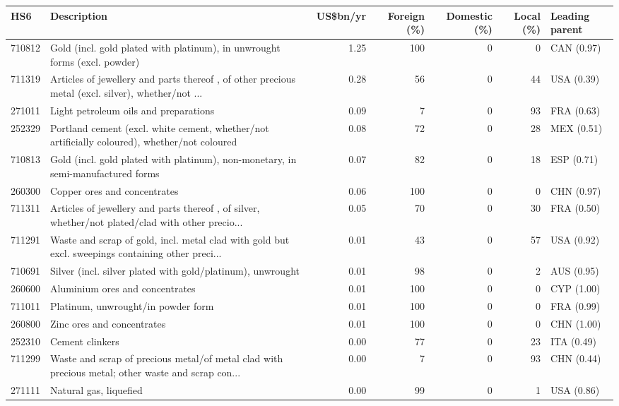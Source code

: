 \begin{tabular}{@{}l p{6.4cm} r r r r l@{}}
\toprule
HS6 & Description & US\$bn/yr & Foreign (\%) & Domestic (\%) & Local (\%) & Leading parent \\
\midrule
710812 & Gold (incl. gold plated with platinum), in unwrought forms (excl. powder) & 1.25 & 100 & 0 & 0 & CAN (0.97) \\
711319 & Articles of jewellery and parts thereof , of other precious metal (excl. silver), whether/\allowbreak{}not ... & 0.28 & 56 & 0 & 44 & USA (0.39) \\
271011 & Light petroleum oils and preparations & 0.09 & 7 & 0 & 93 & FRA (0.63) \\
252329 & Portland cement (excl. white cement, whether/\allowbreak{}not artificially coloured), whether/\allowbreak{}not coloured & 0.08 & 72 & 0 & 28 & MEX (0.51) \\
710813 & Gold (incl. gold plated with platinum), non-monetary, in semi-manufactured forms & 0.07 & 82 & 0 & 18 & ESP (0.71) \\
260300 & Copper ores and concentrates & 0.06 & 100 & 0 & 0 & CHN (0.97) \\
711311 & Articles of jewellery and parts thereof , of silver, whether/\allowbreak{}not plated/\allowbreak{}clad with other precio... & 0.05 & 70 & 0 & 30 & FRA (0.50) \\
711291 & Waste and scrap of gold, incl. metal clad with gold but excl. sweepings containing other preci... & 0.01 & 43 & 0 & 57 & USA (0.92) \\
710691 & Silver (incl. silver plated with gold/\allowbreak{}platinum), unwrought & 0.01 & 98 & 0 & 2 & AUS (0.95) \\
260600 & Aluminium ores and concentrates & 0.01 & 100 & 0 & 0 & CYP (1.00) \\
711011 & Platinum, unwrought/\allowbreak{}in powder form & 0.01 & 100 & 0 & 0 & FRA (0.99) \\
260800 & Zinc ores and concentrates & 0.01 & 100 & 0 & 0 & CHN (1.00) \\
252310 & Cement clinkers & 0.00 & 77 & 0 & 23 & ITA (0.49) \\
711299 & Waste and scrap of precious metal/\allowbreak{}of metal clad with precious metal; other waste and scrap con... & 0.00 & 7 & 0 & 93 & CHN (0.44) \\
271111 & Natural gas, liquefied & 0.00 & 99 & 0 & 1 & USA (0.86) \\
\bottomrule
\end{tabular}
